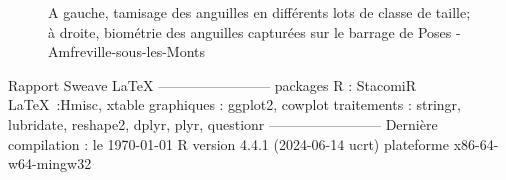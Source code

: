 \documentclass[11pt,titlepage,twoside]{article}\usepackage[]{graphicx}\usepackage[table]{xcolor}
\def\\{}%
\begin{document}
\begin{figure}[hptb]
\begin{subfigure}[b]{0.4\textwidth}
    \end{subfigure}
       \caption{A gauche, tamisage des anguilles en différents lots de classe de taille; à droite, biométrie des anguilles capturées sur le barrage de Poses - Amfreville-sous-les-Monts}
       \label{protocole_bio_ang}
\end{figure}

\clearpage





\normalsize
\null
\vfill

Rapport Sweave \LaTeX \\
------------------------\\
packages R : \vspace{1mm}
StacomiR \citep{legrand_stacomir_2019}\\
\LaTeX \ :Hmisc, xtable\\
graphiques : ggplot2, cowplot\\
traitements : stringr, lubridate, reshape2, dplyr, plyr, questionr\\
------------------------\\
Dernière compilation : le \today \\
 R version 4.4.1 (2024-06-14 ucrt)\\
 plateforme x86-64-w64-mingw32

\clearpage
\end{document}
